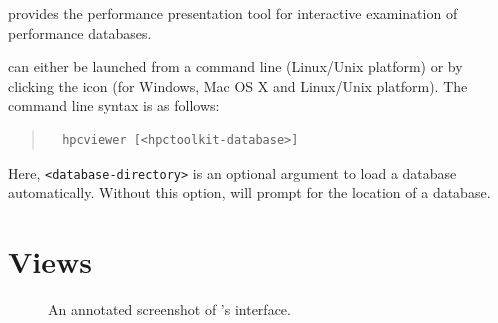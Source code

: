 

\HPCToolkit{} provides the \hpcviewer{} performance presentation tool for interactive examination of performance databases.

\hpcviewer{} can either be launched from a command line (Linux/Unix platform) or by clicking the \hpcviewer{} icon (for Windows, Mac OS X and Linux/Unix platform).
The command line syntax is as follows:
\begin{quote}
\begin{verbatim}
  hpcviewer [<hpctoolkit-database>]
\end{verbatim}
\end{quote}
Here, \texttt{<database-directory>} is an optional argument to load a database automatically.
Without this option, \hpcviewer{} will prompt for the location of a database.



\section{Views}

\begin{figure}[t]
\caption{An annotated screenshot of \hpcviewer{}'s interface.}
\label{fig:hpcviewer-legend}
\end{figure}

